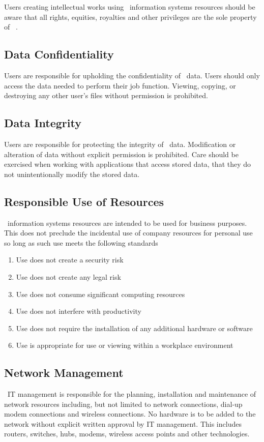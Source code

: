 \documentclass[use]{policy}
\begin{document}
			Users creating intellectual works using \theOrganization\  information systems resources should be aware that all rights, equities, royalties and other privileges are the sole property of \theOrganization\ .  
		
		\subsection{Data Confidentiality}
			Users are responsible for upholding the confidentiality of \theOrganization\  data.  Users should only access the data needed to perform their job function. Viewing, copying, or destroying any other user’s files without permission is prohibited.
	
		\subsection{Data Integrity}
			Users are responsible for protecting the integrity of \theOrganization\  data.  Modification or alteration of data without explicit permission is prohibited.  Care should be exercised when working with applications that access stored data, that they do not unintentionally modify the stored data.
	
		\subsection{Responsible Use of Resources}
			\theOrganization\  information systems resources are intended to be used for business purposes. This does not preclude the incidental use of company resources for personal use so long as such use meets the following standards
			
			\begin{enumerate}[label=\alph*)]
				\item Use does not create a security risk
				\item Use does not create any legal risk
				\item Use does not consume significant computing resources
				\item Use does not interfere with productivity
				\item Use does not require the installation of any additional hardware or software
				\item Use is appropriate for use or viewing within a workplace environment
			\end{enumerate}
		
		\subsection{Network Management}
			\theOrganization\  IT management is responsible for the planning, installation and maintenance of network resources including, but not limited to network connections, dial-up modem connections and wireless connections.  No hardware is to be added to the network without explicit written approval by IT management.  This includes routers, switches, hubs, modems, wireless access points and other technologies.  
	
\end{document}
